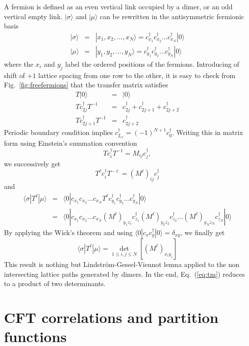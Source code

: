 \documentclass[11pt]{iopart}
\begin{document}
A fermion is defined as an even vertical link occupied by a dimer, or an odd vertical empty link. $|\sigma\rangle$ and $|\mu\rangle$ can be rewritten in the antisymmetric fermionic basis
\begin{eqnarray}
|\sigma \rangle&=&|x_1,x_2,\ldots,x_N\rangle=c_{x_1}^\dag c_{x_2}^\dag \ldots c_{x_N}^\dag |0\rangle \\
|\mu \rangle&=&|y_1,y_2,\ldots,y_N\rangle=c_{y_1}^\dag c_{y_2}^\dag \ldots c_{y_N}^\dag |0\rangle
\end{eqnarray}
where the $x_i$ and $y_j$ label the ordered positions of the fermions. Introducing of shift of $+1$ lattice spacing from one row to the other, it is easy to check from Fig.~\ref{fig:freefermions} that the transfer matrix satisfies
\begin{eqnarray}
T|0\rangle&=&|0\rangle\\
T c_{2j}^\dag T^{-1}&=&c_{2j}^\dag+c_{2j+1}^\dag +c_{2j+2}^\dag\\
T c_{2j+1}^\dag T^{-1}&=&c_{2j+2}^\dag
\end{eqnarray}
Periodic boundary condition implies $c_{L_x}^\dag=(-1)^{N+1}c_0^\dag$. Writing this in matrix form using Einstein's summation convention
\begin{equation}
 T c_i^\dag T^{-1}=M_{ij} c_j^\dag,
\end{equation}
we successively get
\begin{equation}
 T^\ell c_i^\dag T^{-\ell}=\left(M^\ell\right)_{ij} c_j^\dag
\end{equation}
and 
\begin{eqnarray}
\langle \sigma |T^\ell |\mu\rangle&=&\langle 0|c_{x_1} c_{x_2} \ldots c_{x_N} T^{\ell} c_{y_1}^\dag c_{y_2}^\dag \ldots c_{y_N}^\dag |0\rangle \\ 
&=&\langle 0|c_{x_1} c_{x_2} \ldots c_{x_N} (M^\ell)_{y_1 z_1}c_{z_1}^\dag (M^\ell)_{y_2 z_2}c_{z_2}^\dag \ldots (M^\ell)_{y_N z_N}c_{z_N}^\dag|0\rangle
\end{eqnarray}
By applying the Wick's theorem and using $\langle 0|c_x c_y^\dag|0\rangle=\delta_{xy}$, we finally get
\begin{equation}
 \langle \sigma |T^\ell |\mu\rangle=\det_{1\leq i,j\leq N} \left[(M^\ell)_{x_i y_j}\right]
\end{equation}
This result is nothing but Lindstr\"om-Gessel-Viennot\cite{Lindstrom1973,GesselViennot1989} lemna applied to the non intersecting lattice paths generated by dimers. In the end, Eq.~(\ref{eq:tm}) reduces to a product of two determinants. 
\section{CFT correlations and partition functions}
\label{sec:CFT_Jacobi}
\end{document}
